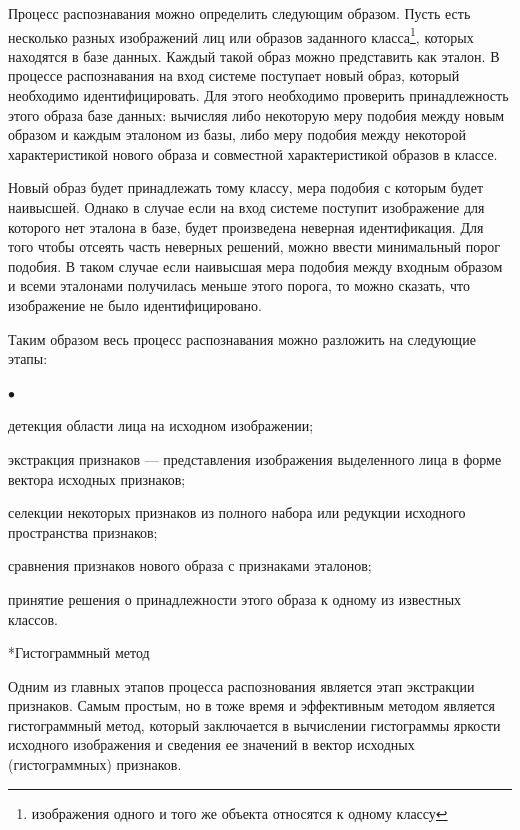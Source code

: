 \documentclass[a4paper,12pt,titlpage]{posobie}
\makeatletter
\newcommand{\MarkDot}{{$\bullet$}} %
\newenvironment{dotlist}%
    {\begin{list}{\MarkDot}{\partopsep=0mm\itemsep=0mm\topsep=0mm\parsep=0mm\partopsep=0mm\parskip=0mm}}%
    {\end{list}}
\renewcommand{\section}{\@startsection{section}{1}{0.0cm}{0.5cm}{0.1cm}%
             {\fontsize{16}{16}\bf\selectfont }}
\makeatother
\begin{document}
    Процесс распознавания можно определить следующим образом. Пусть есть несколько разных изображений лиц 
или образов заданного класса\footnote{изображения одного и того же объекта относятся к одному классу}, которых находятся в базе 
данных. Каждый такой образ можно представить как эталон. В процессе распознавания на вход системе поступает новый образ, 
который необходимо идентифицировать. Для этого необходимо проверить принадлежность этого образа базе данных: вычисляя
либо некоторую меру подобия между новым образом и каждым эталоном из базы, либо меру подобия между некоторой характеристикой
нового образа и совместной характеристикой образов в классе.

     Новый образ будет принадлежать тому классу, мера подобия с которым будет наивысшей. Однако в случае если на вход системе
поступит изображение для которого нет эталона в базе, будет произведена неверная идентификация. Для того чтобы отсеять часть неверных 
решений, можно ввести минимальный порог подобия. В таком случае если наивысшая мера подобия между входным образом и всеми эталонами
получилась меньше этого порога, то можно сказать, что изображение не было идентифицировано. 

Таким образом весь процесс распознавания можно разложить на следующие этапы:
\begin{dotlist}
\item детекция области лица на исходном изображении;
\item экстракция признаков --- представления изображения выделенного лица в форме вектора исходных признаков;
\item селекции некоторых признаков из полного набора или редукции исходного пространства признаков;
\item сравнения признаков нового образа с признаками эталонов;
\item принятие решения о принадлежности этого образа к одному из известных классов.
\end{dotlist}

\section*{Гистограммный метод}
     Одним из главных этапов процесса распознования является этап экстракции признаков. Самым простым, но в тоже время
и эффективным методом является гистограммный метод, который заключается в вычислении гистограммы яркости исходного изображения и 
сведения ее значений в вектор исходных (гистограммных) признаков. 
\end{document}

